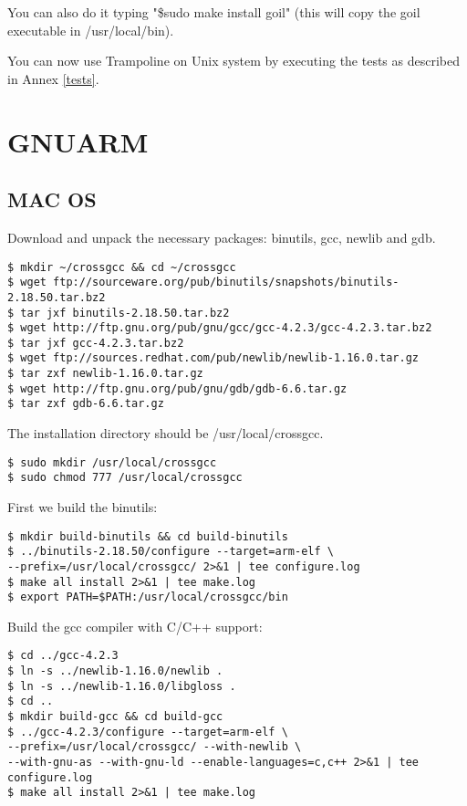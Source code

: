 You can also do it typing "\$sudo make install goil" (this will copy the goil executable in /usr/local/bin).

You can now use Trampoline on Unix system by executing the tests as described in Annex \ref{tests}.

\section{GNUARM}
\subsection{MAC OS}
Download and unpack the necessary packages: binutils, gcc, newlib and gdb.
\begin{verbatim}
$ mkdir ~/crossgcc && cd ~/crossgcc
$ wget ftp://sourceware.org/pub/binutils/snapshots/binutils-2.18.50.tar.bz2
$ tar jxf binutils-2.18.50.tar.bz2
$ wget http://ftp.gnu.org/pub/gnu/gcc/gcc-4.2.3/gcc-4.2.3.tar.bz2
$ tar jxf gcc-4.2.3.tar.bz2
$ wget ftp://sources.redhat.com/pub/newlib/newlib-1.16.0.tar.gz
$ tar zxf newlib-1.16.0.tar.gz
$ wget http://ftp.gnu.org/pub/gnu/gdb/gdb-6.6.tar.gz
$ tar zxf gdb-6.6.tar.gz
\end{verbatim}

The installation directory should be /usr/local/crossgcc.

\begin{verbatim}
$ sudo mkdir /usr/local/crossgcc
$ sudo chmod 777 /usr/local/crossgcc
\end{verbatim}

First we build the binutils:

\begin{verbatim}
$ mkdir build-binutils && cd build-binutils
$ ../binutils-2.18.50/configure --target=arm-elf \
--prefix=/usr/local/crossgcc/ 2>&1 | tee configure.log
$ make all install 2>&1 | tee make.log
$ export PATH=$PATH:/usr/local/crossgcc/bin
\end{verbatim}

Build the gcc compiler with C/C++ support:

\begin{verbatim}
$ cd ../gcc-4.2.3
$ ln -s ../newlib-1.16.0/newlib .
$ ln -s ../newlib-1.16.0/libgloss .
$ cd ..
$ mkdir build-gcc && cd build-gcc
$ ../gcc-4.2.3/configure --target=arm-elf \
--prefix=/usr/local/crossgcc/ --with-newlib \
--with-gnu-as --with-gnu-ld --enable-languages=c,c++ 2>&1 | tee configure.log
$ make all install 2>&1 | tee make.log
\end{verbatim}

